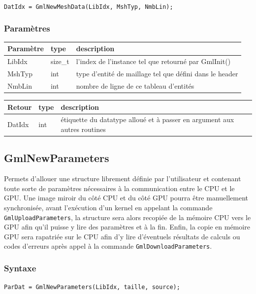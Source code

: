 \documentclass[a4paper,12pt]{article}
\begin{document}
{\tt DatIdx = GmlNewMeshData(LibIdx, MshTyp, NmbLin);}

\subsubsection*{Paramètres}

\begin{tabular}{|m{2cm}|m{1.5cm}|m{10.5cm}|}
\hline
Paramètre  & type    & description \\
\hline
LibIdx     & size\_t & l'index de l'instance tel que retourné par GmlInit() \\
\hline
MshTyp     & int     & type d'entité de maillage tel que défini dans le header \\
\hline
NmbLin     & int     & nombre de ligne de ce tableau d'entités \\
\hline
\end{tabular}

\medskip

\begin{tabular}{|m{2cm}|m{1.5cm}|m{10.5cm}|}
\hline
Retour     & type   & description \\
\hline
DatIdx     & int    & étiquette du datatype alloué et à passer en argument aux autres routines \\
\hline
\end{tabular}


\subsection{GmlNewParameters}

Permets d'allouer une structure librement définie par l'utilisateur et contenant toute sorte de paramètres nécessaires à la communication entre le CPU et le GPU.
Une image miroir du côté CPU et du côté GPU pourra être manuellement synchronisée, avant l'exécution d'un kernel en appelant la commande {\tt GmlUploadParameters}, la structure sera alors recopiée de la mémoire CPU vers le GPU afin qu'il puisse y lire des paramètres et à la fin.
Enfin, la copie en mémoire GPU sera rapatriée sur le CPU afin d'y lire d'éventuels résultats de calculs ou codes d'erreurs après appel à la commande {\tt GmlDownloadParameters}.

\subsubsection*{Syntaxe}

{\tt ParDat = GmlNewParameters(LibIdx, taille, source);}
\end{document}
